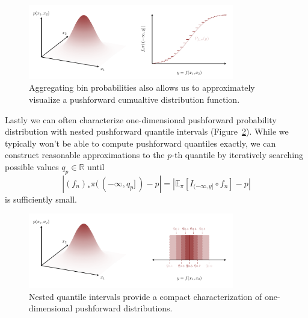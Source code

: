 \documentclass[
  letterpaper,
  DIV=11,
  numbers=noendperiod]{scrartcl}
\begin{document}
\begin{figure}

{\centering \includegraphics[width=0.8\textwidth,height=\textheight]{figures/pushforward_characterizations/cdf/cdf.pdf}

}

\caption{\label{fig-pushforward-characterizations-cdf}Aggregating bin
probabilities also allows us to approximately visualize a pushforward
cumualtive distribution function.}

\end{figure}

Lastly we can often characterize one-dimensional pushforward probability
distribution with nested pushforward quantile intervals
(Figure~\ref{fig-pushforward-characterizations-quantile-intervals}).
While we typically won't be able to compute pushforward quantiles
exactly, we can construct reasonable approximations to the \(p\)-th
quantile by iteratively searching possible values
\(q_{p} \in \mathbb{R}\) until \[
| (f_{n})_{*} \pi( \, (-\infty, q_{p}] \, ) - p |
=
| \mathbb{E}_{\pi} \left[ I_{(-\infty, y]} \circ f_{n} \right] - p |
\] is sufficiently small.

\begin{figure}

{\centering \includegraphics[width=0.8\textwidth,height=\textheight]{figures/pushforward_characterizations/quantile_intervals/quantile_intervals.pdf}

}

\caption{\label{fig-pushforward-characterizations-quantile-intervals}Nested
quantile intervals provide a compact characterization of one-dimensional
pushforward distributions.}

\end{figure}
\end{document}
